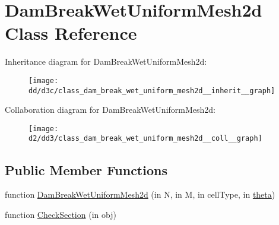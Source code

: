 \hypertarget{class_dam_break_wet_uniform_mesh2d}{}\section{Dam\+Break\+Wet\+Uniform\+Mesh2d Class Reference}
\label{class_dam_break_wet_uniform_mesh2d}


Inheritance diagram for Dam\+Break\+Wet\+Uniform\+Mesh2d\+:
\nopagebreak
\begin{figure}[H]
\begin{center}
\leavevmode
\texttt{[image: dd/d3c/class\_dam\_break\_wet\_uniform\_mesh2d\_\_inherit\_\_graph]}
\end{center}
\end{figure}


Collaboration diagram for Dam\+Break\+Wet\+Uniform\+Mesh2d\+:
\nopagebreak
\begin{figure}[H]
\begin{center}
\leavevmode
\texttt{[image: d2/dd3/class\_dam\_break\_wet\_uniform\_mesh2d\_\_coll\_\_graph]}
\end{center}
\end{figure}
\subsection*{Public Member Functions}
\begin{DoxyCompactItemize}
\item 
function \hyperlink{class_dam_break_wet_uniform_mesh2d_af19c9c31734a0c00a231bb053fa602c6}{Dam\+Break\+Wet\+Uniform\+Mesh2d} (in N, in M, in cell\+Type, in \hyperlink{class_dam_break_wet_uniform_mesh2d_a03e265102071fb0ea1e1119ec9997457}{theta})
\item 
function \hyperlink{class_dam_break_wet_uniform_mesh2d_a0353988fd8c1ab9a9294ca9f4be5d611}{Check\+Section} (in obj)
\end{DoxyCompactItemize}
